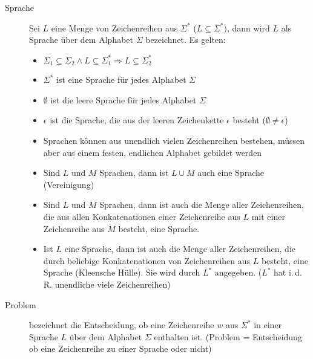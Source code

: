 \begin{description}
\item [Sprache] 
Sei $L$ eine Menge von Zeichenreihen aus $\Sigma^*$ ($L \subseteq \Sigma^*)$, dann
wird $L$ als Sprache über dem Alphabet $\Sigma$ bezeichnet. Es gelten:
\begin{itemize}\itemsep0em
	\item $\Sigma_1 \subseteq \Sigma_2 \wedge L \subseteq \Sigma_1^* \Rightarrow L \subseteq \Sigma_2^*$
	\item $\Sigma^*$ ist eine Sprache für jedes Alphabet $\Sigma$
	\item $\emptyset$ ist die leere Sprache für jedes Alphabet $\Sigma$
	\item $\epsilon$ ist die Sprache, die aus der leeren Zeichenkette $\epsilon$ besteht ($\emptyset \neq \epsilon$)
	\item Sprachen können aus unendlich vielen Zeichenreihen bestehen, müssen aber aus einem festen, endlichen Alphabet gebildet werden
	\item Sind $L$ und $M$ Sprachen, dann ist $L \cup M$ auch eine Sprache (Vereinigung)
	\item Sind $L$ und $M$ Sprachen, dann ist auch die Menge aller Zeichenreihen, 
	die aus allen Konkatenationen einer Zeichenreihe aus $L$ mit einer Zeichenreihe aus $M$ besteht,
	eine Sprache.
	\item Ist $L$ eine Sprache, dann ist auch die Menge aller Zeichenreihen, die durch beliebige Konkatenationen
	von Zeichenreihen aus $L$ besteht, eine Sprache (Kleensche Hülle). Sie wird durch $L^*$ angegeben. ($L^*$ hat i.\,d.\,R. unendliche viele Zeichenreihen)
\end{itemize}
\item[Problem] bezeichnet die Entscheidung, ob eine Zeichenreihe $w$ aus $\Sigma^*$ in einer Sprache $L$ über dem
	Alphabet $\Sigma$ enthalten ist. (Problem = Entscheidung ob eine Zeichenreihe zu einer Sprache oder nicht)

\end{description}


